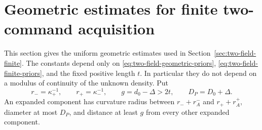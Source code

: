 \section{Geometric estimates for finite two-command acquisition}
\label{sec:two-field-geometric-details}
This section gives the uniform geometric estimates used in
Section~\ref{sec:two-field-finite}.  The constants depend only on
\eqref{eq:two-field-geometric-priors},
\eqref{eq:two-field-finite-priors}, and the fixed positive length
$t$.  In particular they do not depend on a modulus of continuity
of the unknown density.  Put
\[
 r_- =\kappa_+^{-1},\qquad r_+=\kappa_-^{-1},\qquad
 g=d_0-\Delta>2t,\qquad D_P=D_0+\Delta.
\]
An expanded component has curvature radius between
$r_-+r_A^-$ and $r_++r_A^+$, diameter at most $D_P$, and
distance at least $g$ from every other expanded component.

